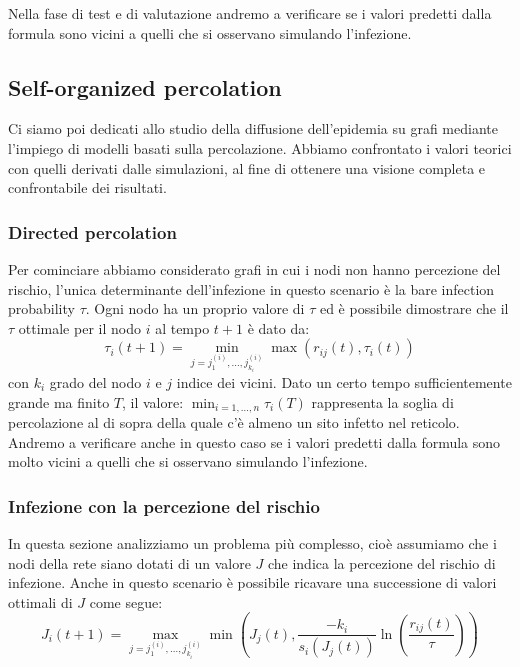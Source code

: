 Nella fase di test e di valutazione andremo a verificare se i valori predetti dalla formula sono vicini a quelli
che si osservano simulando l'infezione.

\subsection{Self-organized percolation}\label{subsec:self-organized-percolation}
Ci siamo poi dedicati allo studio della diffusione dell'epidemia su grafi mediante l'impiego di modelli basati sulla percolazione.
Abbiamo confrontato i valori teorici con quelli derivati dalle simulazioni,
al fine di ottenere una visione completa e confrontabile dei risultati.

\subsubsection{Directed percolation}\label{subsubsec:directed-percolation}
Per cominciare abbiamo considerato grafi in cui i nodi non hanno percezione del rischio, l'unica determinante 
dell'infezione in questo scenario è la bare infection probability $\tau$.
Ogni nodo ha un proprio valore di $\tau$ ed è possibile dimostrare che il $\tau$ ottimale per il nodo $i$ al tempo $t+1$ è dato da:
\begin{equation}
    \tau_{i}(t+1) = \min_{j= j^{(i)}_{1},\dots, j^{(i)}_{k_{i}}}\max(r_{ij}(t), \tau_{i}(t))\label{eq:directed-percolation}
\end{equation}
con $k_{i}$ grado del nodo $i$ e $j$ indice dei vicini.
Dato un certo tempo sufficientemente grande ma finito $T$, il valore: $\min_{i=1,\dots,n}\tau_{i}(T)$ rappresenta
la soglia di percolazione al di sopra della quale c'è almeno un sito infetto nel reticolo.
Andremo a verificare anche in questo caso se i valori predetti dalla formula sono molto vicini a quelli che si osservano
simulando l'infezione.

\subsubsection{Infezione con la percezione del rischio}\label{subsubsec:infezione-con-la-percezione-del-rischio}
In questa sezione analizziamo un problema più complesso, cioè assumiamo che i nodi della rete siano dotati di
un valore $J$ che indica la percezione del rischio di infezione.
Anche in questo scenario è possibile ricavare una successione di valori ottimali di $J$ come segue:
\begin{equation}
    J_{i}(t+1) = \max_{j= j^{(i)}_{1},\dots,j^{(i)}_{k_{i}}}\min\left(J_{j}(t),\frac{-k_{ i}}{s_{i}(J_{j}(t))}\ln\left(\frac{r_{ij}(t)}{\tau}\right)\right)\label{eq:risk-perception}
\end{equation}

